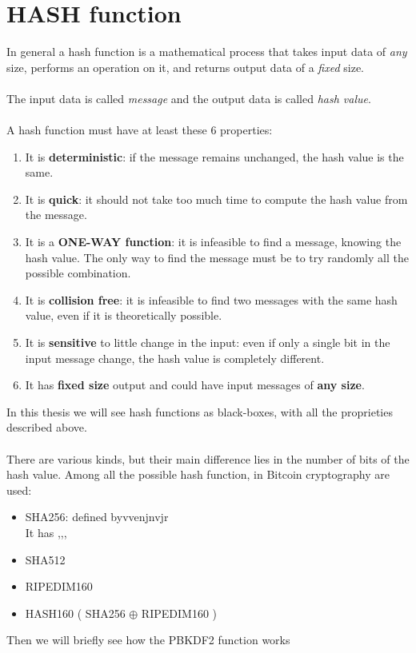 \section{HASH function}
In general a hash function is a mathematical process that takes input data of \textit{any} size, performs an operation on it, and returns output data of a \textit{fixed} size.
\\ \\
The input data is called \textit{message} and the output data is called \textit{hash value}. 
\\ \\
A hash function must have at least these 6 properties:
\begin{enumerate}[label=(\roman*)]
	\item It is \textbf{deterministic}: if the message remains unchanged, the hash value is the same.
	\item It is \textbf{quick}: it should not take too much time to compute the hash value from the message.
	\item It is a \textbf{ONE-WAY function}: it is infeasible to find a message, knowing the hash value. The only way to find the message must be to try randomly all the possible combination.
	\item It is \textbf{collision free}: it is infeasible to find two messages with the same hash value, even if it is theoretically possible.
	\item It is \textbf{sensitive} to little change in the input: even if only a single bit in the input message change, the hash value is completely different.
	\item It has \textbf{fixed size} output and could have input messages of \textbf{any size}.
\end{enumerate}
In this thesis we will see hash functions as black-boxes, with all the proprieties described above. 
\\ \\
There are various kinds, but their main difference lies in the number of bits of the hash value. Among all the possible hash function, in Bitcoin cryptography are used:
\begin{itemize}
	\item SHA256: defined byvvenjnvjr 
	\\
	It has ,,,
	\item SHA512
	\item RIPEDIM160
	\item HASH160 ( SHA256 $\oplus $ RIPEDIM160 )
\end{itemize}
Then we will briefly see how the PBKDF2 function works

